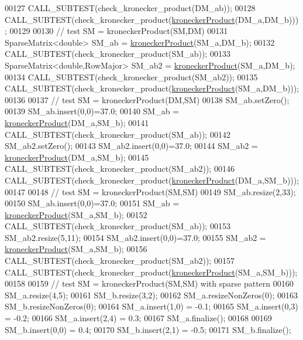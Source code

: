 \begin{DoxyCode}
00127   CALL\_SUBTEST(check\_kronecker\_product(DM\_ab));
00128   CALL\_SUBTEST(check\_kronecker\_product(\hyperlink{namespace_eigen_aedd4b7cd1e324ed0769cac2701f4d050}{kroneckerProduct}(DM\_a,DM\_b)));
00129 
00130   \textcolor{comment}{// test SM = kroneckerProduct(SM,DM)}
00131   SparseMatrix<double> SM\_ab = \hyperlink{namespace_eigen_aedd4b7cd1e324ed0769cac2701f4d050}{kroneckerProduct}(SM\_a,DM\_b);
00132   CALL\_SUBTEST(check\_kronecker\_product(SM\_ab));
00133   SparseMatrix<double,RowMajor> SM\_ab2 = \hyperlink{namespace_eigen_aedd4b7cd1e324ed0769cac2701f4d050}{kroneckerProduct}(SM\_a,DM\_b);
00134   CALL\_SUBTEST(check\_kronecker\_product(SM\_ab2));
00135   CALL\_SUBTEST(check\_kronecker\_product(\hyperlink{namespace_eigen_aedd4b7cd1e324ed0769cac2701f4d050}{kroneckerProduct}(SM\_a,DM\_b)));
00136 
00137   \textcolor{comment}{// test SM = kroneckerProduct(DM,SM)}
00138   SM\_ab.setZero();
00139   SM\_ab.insert(0,0)=37.0;
00140   SM\_ab = \hyperlink{namespace_eigen_aedd4b7cd1e324ed0769cac2701f4d050}{kroneckerProduct}(DM\_a,SM\_b);
00141   CALL\_SUBTEST(check\_kronecker\_product(SM\_ab));
00142   SM\_ab2.setZero();
00143   SM\_ab2.insert(0,0)=37.0;
00144   SM\_ab2 = \hyperlink{namespace_eigen_aedd4b7cd1e324ed0769cac2701f4d050}{kroneckerProduct}(DM\_a,SM\_b);
00145   CALL\_SUBTEST(check\_kronecker\_product(SM\_ab2));
00146   CALL\_SUBTEST(check\_kronecker\_product(\hyperlink{namespace_eigen_aedd4b7cd1e324ed0769cac2701f4d050}{kroneckerProduct}(DM\_a,SM\_b)));
00147 
00148   \textcolor{comment}{// test SM = kroneckerProduct(SM,SM)}
00149   SM\_ab.resize(2,33);
00150   SM\_ab.insert(0,0)=37.0;
00151   SM\_ab = \hyperlink{namespace_eigen_aedd4b7cd1e324ed0769cac2701f4d050}{kroneckerProduct}(SM\_a,SM\_b);
00152   CALL\_SUBTEST(check\_kronecker\_product(SM\_ab));
00153   SM\_ab2.resize(5,11);
00154   SM\_ab2.insert(0,0)=37.0;
00155   SM\_ab2 = \hyperlink{namespace_eigen_aedd4b7cd1e324ed0769cac2701f4d050}{kroneckerProduct}(SM\_a,SM\_b);
00156   CALL\_SUBTEST(check\_kronecker\_product(SM\_ab2));
00157   CALL\_SUBTEST(check\_kronecker\_product(\hyperlink{namespace_eigen_aedd4b7cd1e324ed0769cac2701f4d050}{kroneckerProduct}(SM\_a,SM\_b)));
00158 
00159   \textcolor{comment}{// test SM = kroneckerProduct(SM,SM) with sparse pattern}
00160   SM\_a.resize(4,5);
00161   SM\_b.resize(3,2);
00162   SM\_a.resizeNonZeros(0);
00163   SM\_b.resizeNonZeros(0);
00164   SM\_a.insert(1,0) = -0.1;
00165   SM\_a.insert(0,3) = -0.2;
00166   SM\_a.insert(2,4) =  0.3;
00167   SM\_a.finalize();
00168   
00169   SM\_b.insert(0,0) =  0.4;
00170   SM\_b.insert(2,1) = -0.5;
00171   SM\_b.finalize();

\end{DoxyCode}
